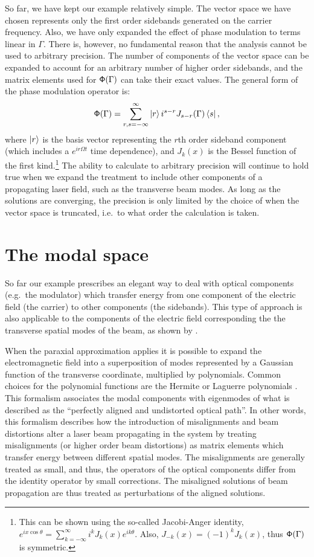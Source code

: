 So far, we have kept our example relatively simple. %
The vector space we have chosen represents only the first order sidebands generated on the carrier frequency. %
Also, we have only expanded the effect of phase modulation to terms linear in $\Gamma$. %
There is, however, no fundamental reason that the analysis cannot be used to arbitrary precision. %
The number of components of the vector space can be expanded to account for an arbitrary number of higher order sidebands, and the matrix elements used for $\mathsf{\Phi}(\Gamma)$ can take their exact values. %
The general form of the phase modulation operator is:
\begin{equation}
\mathsf{\Phi}(\Gamma) = \sum_{r,s=-\infty}^\infty\left| r \right> i^{s-r} J_{s-r}(\Gamma) \left< s \right|,
\end{equation}
where $\left| r \right>$ is the basis vector representing the $r$th order sideband component (which includes a $e^{ir\Omega t}$ time dependence), and $J_k(x)$ is the Bessel function of the first kind.\footnote{This can be shown using the so-called Jacobi-Anger identity, $e^{ix\cos\theta}=\sum_{k=-\infty}^\infty i^kJ_k(x)e^{ik\theta}$. %
Also, $J_{-k}(x)=(-1)^kJ_k(x)$, thus $\mathsf{\Phi}(\Gamma)$ is symmetric.} The ability to calculate to arbitrary precision will continue to hold true when we expand the treatment to include other components of a propagating laser field, such as the transverse beam modes. %
As long as the solutions are converging, the precision is only limited by the choice of when the vector space is truncated, i.e.\ to what order the calculation is taken.

\section{The modal space}
\label{sec:modalspace}
So far our example prescribes an elegant way to deal with optical components (e.g.\ the modulator) which transfer energy from one component of the electric field (the carrier) to other components (the sidebands). %
This type of approach is also applicable to the components of the electric field corresponding the the transverse spatial modes of the beam, as shown by \citet{Hefetz:97}.

When the paraxial approximation applies it is possible to expand the electromagnetic field into a superposition of modes represented by a Gaussian function of the transverse coordinate, multiplied by polynomials. %
Common choices for the polynomial functions are the Hermite or Laguerre polynomials \cite[chap. %
16]{Siegman}. %
This formalism associates the modal components with eigenmodes of what is described as the ``perfectly aligned and undistorted optical path''. %
In other words, this formalism describes how the introduction of misalignments and beam distortions alter a laser beam propagating in the system by treating misalignments (or higher order beam distortions) as matrix elements which transfer energy between different spatial modes. %
The misalignments are generally treated as small, and thus, the operators of the optical components differ from the identity operator by small corrections. %
The misaligned solutions of beam propagation are thus treated as perturbations of the aligned solutions. %


